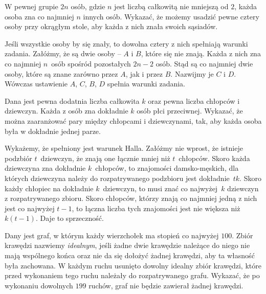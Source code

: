 \newpage
{}

\begin{problem}{1}
	W pewnej grupie $2n$ osób, gdzie $n$ jest liczbą całkowitą nie mniejszą od $2$, każda osoba zna co najmniej $n$ innych osób. Wykazać, że możemy usadzić pewne cztery osoby przy okrągłym stole, aby każda z nich znała swoich sąsiadów.
\end{problem}

\noindent
Jeśli wszystkie osoby by się znały, to dowolna cztery z nich spełniają warunki zadania. Załóżmy, że są dwie osoby -- $A$ i $B$, które się nie znają. Każda z nich zna co najmniej $n$~osób spośród pozostałych $2n - 2$ osób. Stąd są co najmniej dwie osoby, które są znane zarówno przez $A$, jak i przez $B$. Nazwijmy je $C$ i $D$. Wówczas ustawienie $A$, $C$, $B$, $D$ spełnia warunki zadania. 

\vspace{5px}

\begin{problem}{2}
	Dana jest pewna dodatnia liczba całkowita $k$ oraz pewna liczba chłopców i dziewczyn. Każda z osób zna dokładnie $k$ osób płci przeciwnej. Wykazać, że można zaaranżować pary między chłopcami i dziewczynami, tak, aby każda osoba była w dokładnie jednej parze.
\end{problem}

\noindent
Wykażemy, że spełniony jest warunek Halla. Załóżmy nie wprost, że istnieje podzbiór $t$~dziewczyn, że znają one łącznie mniej niż $t$~chłopców. Skoro każda dziewczyna zna dokładnie $k$~chłopców, to znajomości damsko-męskich, dla których dziewczyna należy do rozpatrywanego podzbioru jest dokładnie~$tk$. Skoro każdy chłopiec na dokładnie $k$~dziewczyn, to musi znać co najwyżej~$k$ dziewczyn z rozpatrywanego zbioru. Skoro chłopców, którzy znają co najmniej jedną z nich jest co najwyżej $t - 1$, to łączna liczba tych znajomości jest nie większa niż $k(t - 1)$. Daje to sprzeczność.

\vspace{5px}

\begin{problem}{3}
	Dany jest graf, w którym każdy wierzchołek ma stopień co najwyżej $100$. Zbiór krawędzi nazwiemy \textit{idealnym}, jeśli żadne dwie krawędzie należące do niego nie mają wspólnego końca oraz nie da się dołożyć żadnej krawędzi, aby ta własność była zachowana. W każdym ruchu usunięto dowolny  idealny zbiór krawędzi, które przed wykonaniem tego ruchu należały do rozpatrywanego grafu. Wykazać, że po wykonaniu dowolnych $199$ ruchów, graf nie będzie zawierał żadnej krawędzi.
\end{problem}

